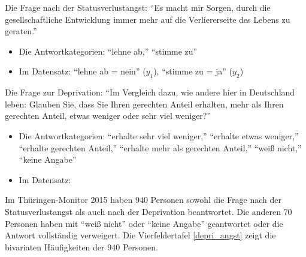 \documentclass[11pt]{article}
\begin{document}
\begin{enumerate}
Die Frage nach der Statusverlustangst: ``Es macht mir Sorgen, durch die gesellschaftliche Entwicklung immer mehr auf die Verliererseite
 des Lebens zu geraten.''
 \begin{itemize}
   \item {Die Antwortkategorien: ``lehne ab,'' ``stimme zu''}
    \item {Im Datensatz: ``lehne ab = nein'' ($y_{1}$), ``stimme zu = ja'' ($y_{2}$)}
  \end{itemize} 
  Die Frage zur Deprivation: ``Im Vergleich dazu, wie andere hier in Deutschland leben: 
   Glauben Sie, dass Sie Ihren gerechten Anteil erhalten, 
   mehr als Ihren gerechten Anteil, etwas weniger oder sehr viel weniger?''
   \begin{itemize} 
   \item{Die Antwortkategorien: ``erhalte sehr viel weniger,'' ``erhalte etwas weniger,''  ``erhalte gerechten Anteil,''         
  ``erhalte mehr als gerechten Anteil,''  ``weiß nicht,'' ``keine Angabe''}
  \item{Im Datensatz:
    \begin{description}
    
     \item {
       \[
     \text{$x_{1}:$ ``erhalte weniger''}=\left\{\begin{array}{ll} \text{``erhalte sehr viel weniger,''} \\
         \text{``erhalte etwas weniger''}\end{array}\right. 
  \]
     }
      \item {
       \[
     \text{$x_{2}:$ ``erhalte genug''}=\left\{\begin{array}{ll} \text{``erhalte gerechten Anteil,''} \\
         \text{``erhalte mehr als gerechten Anteil''}\end{array}\right. 
  \]
     }
    
    \end{description}
      }
 \end{itemize}

Im Thüringen-Monitor 2015 haben $940$ Personen sowohl die Frage nach der 
Statusverlustangst als auch nach der Deprivation beantwortet. Die anderen $70$ Personen haben mit ``weiß nicht'' oder ``keine Angabe''
geantwortet oder die Antwort vollständig verweigert. Die  Vierfeldertafel \ref{depri_angst} zeigt die bivariaten Häufigkeiten
der $940$ Personen.


\end{enumerate}
\end{document}
